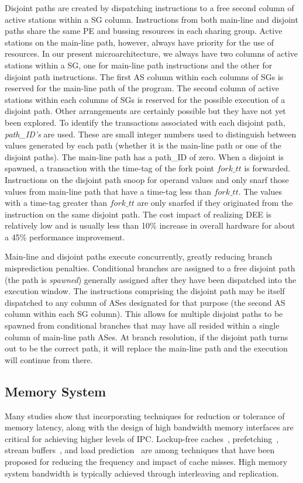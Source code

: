 \documentclass[10pt,twocolumn]{IEEEtran}
\begin{document}
Disjoint paths are created by dispatching instructions to a free 
second column of 
active stations within a SG column.  Instructions from both main-line and
disjoint paths share the same PE and bussing resources in each
sharing group.  Active stations on the main-line path, however,
always have priority for the use of resources.  
In our present
microarchitecture, we always have two columns of active stations
within a SG, one for main-line path instructions and the other for disjoint
path instructions.
The f{ir}st AS column within each columns of SGs is reserved for the main-line
path of the program. 
The second column of active stations within each columns of SGs is
reserved for the possible execution of a disjoint path.  
Other arrangements are certainly possible but they have not yet been
explored.
To identify
the transactions associated with each disjoint path,
\emph{path\_ID's} are used.  
These are small integer numbers used to distinguish
between values generated by each path (whether it is the main-line path
or one of the disjoint paths).  
The main-line path has a path\_ID of zero.  
When a disjoint is spawned,
a transaction with the time-tag of the fork point $fork\_tt$ is forwarded.
Instructions on the disjoint path snoop for operand values and only snarf
those values from main-line path that have a time-tag less than $fork\_tt$.
The values with a time-tag greater than $fork\_tt$ are only snarfed if they
originated from the instruction on the same disjoint path.
The cost impact of realizing DEE is relatively low and is usually
less than 10\% increase in overall hardware for about a 45\% performance
improvement.

Main-line and disjoint paths execute concurrently, greatly reducing
branch misprediction penalties.  Conditional branches are assigned
to a free disjoint path (the path is \emph{spawned}) generally
assigned after they have been dispatched
into the execution window.  
The instructions comprising the disjoint path may be itself
dispatched to any column of ASes designated for that purpose (the
second AS column within each SG column).
This allows for multiple disjoint paths to be spawned from
conditional branches that may have all resided within a single
column of main-line path ASes.
At branch resolution,  if the disjoint path turns out to be the
correct path, it will replace the main-line path and the execution
will continue from there.
%
%
\subsection {Memory System}
%
Many studies show that incorporating techniques for reduction or
tolerance of memory latency, along with the design of high bandwidth memory 
interfaces are critical for achieving higher levels of IPC.  
Lockup-free caches~\cite{Kroft81}, prefetching~\cite{Chen94a,Fu92},
stream buffers~\cite{Palacharla94}, and
load prediction~\cite{lipasti96value} are among techniques that
have been proposed for reducing the frequency and impact of cache misses.  
High memory system bandwidth is typically achieved through 
interleaving and replication.
\end{document}
